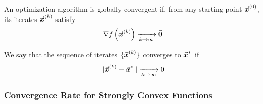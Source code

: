 \begin{definition}
An optimization algorithm is globally convergent if, from any starting point \(\vec{\boldsymbol{x}}^{(0)}\), its iterates \(\vec{\boldsymbol{x}}^{(k)}\) satisfy
\[
\nabla f\left(\vec{\boldsymbol{x}}^{(k)}\right) \xrightarrow[k \rightarrow \infty]{} \vec{\boldsymbol{0}}
\]
\end{definition}

\begin{definition}
We say that the sequence of iterates \(\{\vec{\boldsymbol{x}}^{(k)}\}\) converges to \(\vec{\boldsymbol{x}}^{*}\) if
\[
\|\vec{\boldsymbol{x}}^{(k)}-\vec{\boldsymbol{x}}^{*}\| \xrightarrow[k \rightarrow \infty]{} 0
\]
\end{definition}

\subsubsection{Convergence Rate for Strongly Convex Functions}
\label{subsec:gd_strongly_convex}
